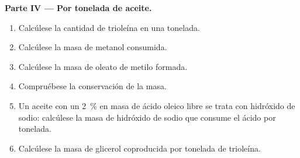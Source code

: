 \begin{problem}
\medskip
\noindent\textbf{Parte IV --- Por tonelada de aceite.}
\begin{enumerate}[resume]
  \item Calcúlese la cantidad de trioleína en una tonelada.
  \item Calcúlese la masa de metanol consumida.
  \item Calcúlese la masa de oleato de metilo formada.
  \item Compruébese la conservación de la masa.
  \item Un aceite con un 2~\% en masa de ácido oleico libre se trata con hidróxido de sodio: calcúlese la masa de
        hidróxido de sodio que consume el ácido por tonelada.
  \item Calcúlese la masa de glicerol coproducida por tonelada de trioleína.
\end{enumerate}
\end{problem}

